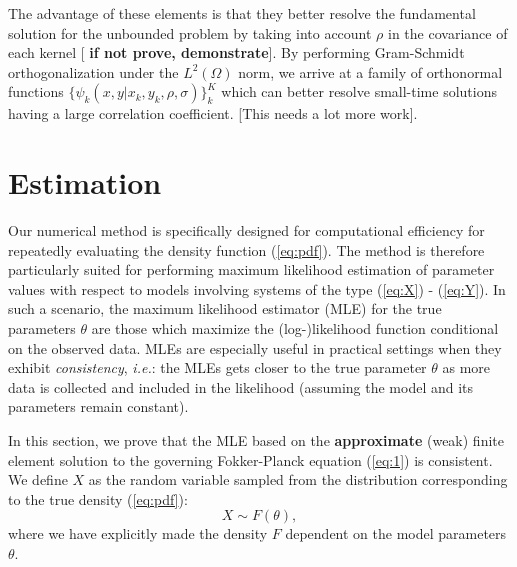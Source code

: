 \documentclass[10pt]{article}
\begin{document}
The advantage of these elements is that they better resolve the
fundamental solution for the unbounded problem by taking into account
$\rho$ in the covariance of each kernel [\textbf{\color{red} if not
  prove, demonstrate}]. By performing Gram-Schmidt orthogonalization
under the $L^2(\Omega)$ norm, we arrive at a family of orthonormal
functions $\{ \psi_k(x,y| x_k, y_k, \rho, \sigma) \}_{k}^K$ which can
better resolve small-time solutions having a large correlation
coefficient. [This needs a lot more work].

\section{Estimation}
Our numerical method is specifically designed for computational
efficiency for repeatedly evaluating the density function
(\ref{eq:pdf}). The method is therefore particularly suited for
performing maximum likelihood estimation of parameter values with
respect to models involving systems of the type (\ref{eq:X}) -
(\ref{eq:Y}). In such a scenario, the maximum likelihood estimator
(MLE) for the true parameters $\theta$ are those which maximize the
(log-)likelihood function conditional on the observed data. MLEs are
especially useful in practical settings when they exhibit
\textit{consistency}, \textit{i.e.}: the MLEs gets closer to the true
parameter $\theta$ as more data is collected and included in the
likelihood (assuming the model and its parameters remain constant).

In this section, we prove that the MLE based on the
\textbf{approximate} (weak) finite element solution to the governing
Fokker-Planck equation (\ref{eq:1}) is consistent. We define $X$ as
the random variable sampled from the distribution corresponding to the
true density (\ref{eq:pdf}):
\[
  X \sim F(\theta),
\]
where we have explicitly made the density $F$ dependent on the model
parameters $\theta$.
\end{document}
